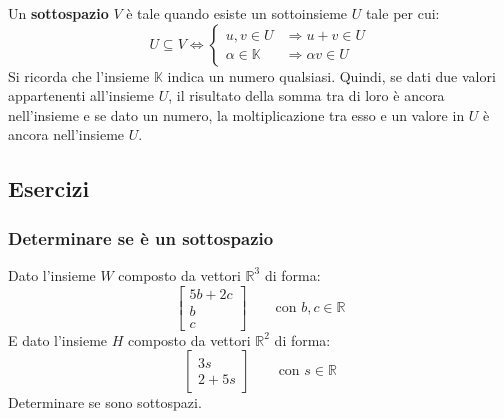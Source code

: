 \documentclass[a4paper]{article}
\begin{document}
	Un \textbf{sottospazio} $V$ è tale quando esiste un sottoinsieme $U$ tale per cui:
	\begin{equation*}
		U \subseteq V \iff \begin{cases}
			u,v \in U 				& \Longrightarrow u+v \in U \\
			\alpha \in \mathbb{K} 	& \Longrightarrow \alpha v \in U
		\end{cases}
	\end{equation*}
	Si ricorda che l'insieme $\mathbb{K}$ indica un numero qualsiasi. Quindi, se dati due valori appartenenti all'insieme $U$, il risultato della somma tra di loro è ancora nell'insieme e se dato un numero, la moltiplicazione tra esso e un valore in $U$ è ancora nell'insieme $U$.
	
	\subsection{Esercizi}
	
	\subsubsection{Determinare se è un sottospazio}
	
	Dato l'insieme $W$ composto da vettori $\mathbb{R}^{3}$ di forma:
	\begin{equation*}
		\begin{bmatrix}
			5b + 2c \\
			b \\
			c
		\end{bmatrix} \hspace{2em} \text{con } b,c \in \mathbb{R}
	\end{equation*}
	E dato l'insieme $H$ composto da vettori $\mathbb{R}^{2}$ di forma:
	\begin{equation*}
		\begin{bmatrix}
			3s \\
			2 + 5s
		\end{bmatrix} \hspace{2em} \text{con } s \in \mathbb{R}
	\end{equation*}
	Determinare se sono sottospazi.\newline
	
\end{document}
